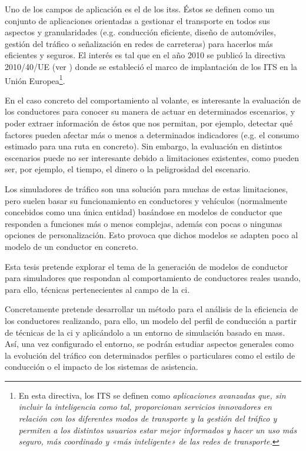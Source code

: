 Uno de los campos de aplicación es el de los \acp{its}. Éstos se definen como un conjunto de aplicaciones orientadas a gestionar el transporte en todos sus aspectos y granularidades (e.g. conducción eficiente, diseño de automóviles, gestión del tráfico o señalización en redes de carreteras) para hacerlos más eficientes y seguros. El interés es tal que en el año 2010 se publicó la directiva 2010/40/UE (ver \cite{parliament2010directive}) donde se estableció el marco de implantación de los ITS en la Unión Europea\footnote{En esta directiva, los ITS se definen como \textit{aplicaciones avanzadas que, sin incluir la inteligencia como tal, proporcionan servicios innovadores en relación con los diferentes modos de transporte y la gestión del tráfico y permiten a los distintos usuarios estar mejor informados y hacer un uso más seguro, más coordinado y «más inteligente» de las redes de transporte.}}.

En el caso concreto del comportamiento al volante, es interesante la evaluación de los conductores para conocer su manera de actuar en determinados escenarios, y poder extraer información de éstos que nos permitan, por ejemplo, detectar qué factores pueden afectar más o menos a determinados indicadores (e.g. el consumo estimado para una ruta en concreto). Sin embargo, la evaluación en distintos escenarios puede no ser interesante debido a limitaciones existentes, como pueden ser, por ejemplo, el tiempo, el dinero o la peligrosidad del escenario.

Los simuladores de tráfico son una solución para muchas de estas limitaciones, pero suelen basar su funcionamiento en conductores y vehículos (normalmente concebidos como una única entidad) basándose en modelos de conductor que responden a funciones más o menos complejas, además con pocas o ningunas opciones de personalización. Esto provoca que dichos modelos se adapten poco al modelo de un conductor en concreto.

Esta tesis pretende explorar el tema de la generación de modelos de conductor para simuladores que respondan al comportamiento de conductores reales usando, para ello, técnicas pertenecientes al campo de la \ac{ci}.

Concretamente pretende desarrollar un método para el análisis de la eficiencia de los conductores realizando, para ello, un modelo del perfil de conducción a partir de técnicas de la \ac{ci} y aplicándolo a un entorno de simulación basado en \Acp{mas}. Así, una vez configurado el entorno, se podrán estudiar aspectos generales como la evolución del tráfico con determinados perfiles o particulares como el estilo de conducción o el impacto de los sistemas de asistencia.

